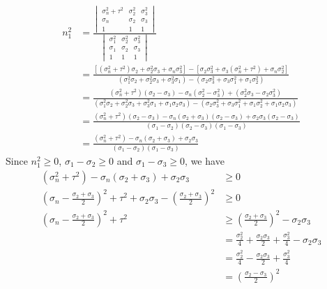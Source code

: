\begin{align}
n_1^2 &= \frac{\begin{vmatrix}
\sigma_n^2 + \tau^2 & \sigma_2^2 & \sigma_3^2 \\
\sigma_n & \sigma_2 & \sigma_3 \\
1 & 1 & 1
\end{vmatrix}}
{\begin{vmatrix}
\sigma_1^2 & \sigma_2^2 & \sigma_3^2 \\
\sigma_1 & \sigma_2 & \sigma_3 \\
1 & 1 & 1    
\end{vmatrix}} \nonumber \\
&= \frac{[(\sigma_n^2 + \tau^2)\sigma_2 + \sigma_2^2 \sigma_3 + \sigma_n\sigma_3^2] - [\sigma_2\sigma_3^2 + \sigma_3(\sigma_n^2 + \tau^2) + \sigma_n\sigma_2^2]}{(\sigma_1^2\sigma_2 + \sigma_2^2\sigma_3 + \sigma_3^2\sigma_1) - (\sigma_2\sigma_3^2 + \sigma_3\sigma_1^2 + \sigma_1\sigma_2^2)} \nonumber \\
&= \frac{(\sigma_n^2 + \tau^2)(\sigma_2 - \sigma_3) - \sigma_n(\sigma_2^2 - \sigma_3^2)+(\sigma_2^2\sigma_3 - \sigma_2\sigma_3^2)}{(\sigma_1^2\sigma_2 + \sigma_2^2\sigma_3 + \sigma_3^2\sigma_1 + \sigma_1\sigma_2\sigma_3) - (\sigma_2\sigma_3^2 + \sigma_3\sigma_1^2 + \sigma_1\sigma_2^2 + \sigma_1\sigma_2\sigma_3)} \nonumber \\
&= \frac{(\sigma_n^2 + \tau^2)(\sigma_2 - \sigma_3) - \sigma_n(\sigma_2 + \sigma_3)(\sigma_2 - \sigma_3) + \sigma_2\sigma_3(\sigma_2 - \sigma_3)}{(\sigma_1 - \sigma_2)(\sigma_2 - \sigma_3)(\sigma_1-\sigma_3)} \nonumber \\
&= \frac{(\sigma_n^2 + \tau^2) - \sigma_n(\sigma_2 + \sigma_3) + \sigma_2\sigma_3}{(\sigma_1 - \sigma_2)(\sigma_1-\sigma_3)}
\end{align}
Since $n_1^2 \geq 0$, $\sigma_1 - \sigma_2 \geq 0$ and $\sigma_1 - \sigma_3 \geq 0$, we have
\begin{align}
(\sigma_n^2 + \tau^2) - \sigma_n(\sigma_2 + \sigma_3) + \sigma_2\sigma_3 &\geq 0 \nonumber \\
(\sigma_n-\frac{\sigma_2 + \sigma_3}{2})^2 + \tau^2 + \sigma_2\sigma_3 - (\frac{\sigma_2 + \sigma_3}{2})^2 &\geq 0 \nonumber \\
(\sigma_n-\frac{\sigma_2 + \sigma_3}{2})^2 + \tau^2 &\geq (\frac{\sigma_2 + \sigma_3}{2})^2 - \sigma_2\sigma_3 \nonumber \\
&= \frac{\sigma_2^2}{4} + \frac{\sigma_2\sigma_3}{2} +\frac{\sigma_3^2}{4} - \sigma_2\sigma_3 \nonumber \\
&= \frac{\sigma_2^2}{4} - \frac{\sigma_2\sigma_3}{2} +\frac{\sigma_3^2}{4} \nonumber \\
&= (\frac{\sigma_2 - \sigma_3}{2})^2
\end{align}
